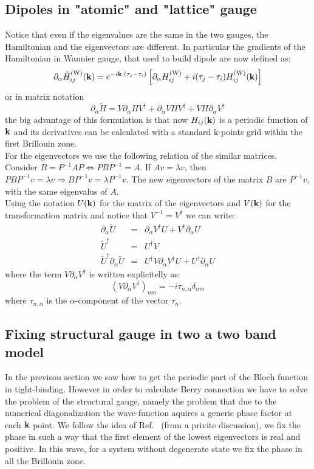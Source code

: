 \documentclass[preprint,showpacs,prb,superscriptaddress,aps,floatfix]{revtex4-1}
\newcommand{\kk}{{\bf k}}
\newcommand{\be}{\begin{equation}}
\newcommand{\ee}{\end{equation}}
\newcommand{\bea}{\begin{eqnarray}}
\newcommand{\eea}{\end{eqnarray}}
\renewcommand{\[}{\left[}
\renewcommand{\]}{\right]}
\renewcommand{\(}{\left(}
\renewcommand{\)}{\right)}
\def\pw{^{({\rm W})}}
\begin{document}
\subsection{Dipoles in "atomic" and "lattice" gauge}
Notice that even if the eigenvalues are the same in the two gauges, the Hamiltonian and the eigenvectors are different. In particular the gradients of the Hamiltonian in Wannier gauge, that used to build dipole are now defined as:
\be
\partial_\alpha \tilde H_{ij}\pw(\kk)=e^{-i \kk \cdot (\tau_j -\tau_i)} \left [ \partial_\alpha H_{ij}\pw + i(\tau_j -\tau_i) H_{ij}\pw(\kk) \right ]
\ee
or in matrix notation
\be
\partial_\alpha \tilde H=V \partial_\alpha H V^\dagger + \partial_\alpha V H V^\dagger +  V H \partial_\alpha V^\dagger 
\ee
the big advantage of this formulation is that now $H_{ij}(\kk)$ is a periodic function of  $\kk$ and its derivatives can be calculated with a standard k-points grid within the first Brillouin zone.\\
For the eigenvectors we use the following relation of the similar matrices. Consider $B=P^{-1}AP \Longleftrightarrow  P B P^{-1} =A$. If $Av=\lambda v$, then $PBP^{-1} v = \lambda v \Longrightarrow BP^{-1} v = \lambda P^{-1} v $. The new eigenvectors of the matrix $B$ are $P^{-1} v$, with the same eigenvalus of $A$.\\
Using the notation $U(\kk)$ for the matrix of the eigenvectors and $V(\kk)$ for the transformation matrix and notice that $V^{-1} = V^{\dagger}$ we can write:
\bea
\partial_\alpha \tilde U &=& \partial_\alpha V^{\dagger} U + V^{\dagger} \partial_\alpha U \\
\tilde U^{\dagger} &=& U^{\dagger} V \\
\tilde U^{\dagger} \partial_\alpha \tilde U &=& U^{\dagger} V \partial_\alpha V^{\dagger} U + U^{\dagger} \partial_\alpha U
\eea
where the term $V \partial_\alpha V^{\dagger}$ is written explicitelly as:
\be
(V \partial_\alpha V^{\dagger})_{nm}=-i\tau_{n,\alpha}\delta_{nm}
\ee
where $\tau_{n,\alpha}$ is the $\alpha$-component of the vector $\tau_n$.

\subsection{Fixing structural gauge in two a two band model}
In the previsou section we saw how to get the periodic part of the Bloch function in tight-binding. However in order to calculate Berry connection we have to solve the problem of the structural gauge,\cite{yue2022introduction} namely the problem that due to the numerical diagonalization the wave-function aquires a generic phase factor at each $\kk$ point. We follow the idea of Ref.~ (from a privite discussion), we fix the phase in such a way that the first element of the lowest eigenvectors is real and positive. In this wave, for a system without degenerate state we fix the phase in all the  Brillouin zone.
\end{document}
